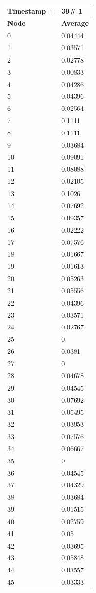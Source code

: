 \begin{tabular}{|l||l|}
\hline
\textbf{Timestamp =} & \textbf{39}\# 1\\\hline
	\textbf{Node} & \textbf{Average} \\ \hline
\hline
	0 & 0.04444 \\ \hline
	1 & 0.03571 \\ \hline
	2 & 0.02778 \\ \hline
	3 & 0.00833 \\ \hline
	4 & 0.04286 \\ \hline
	5 & 0.04396 \\ \hline
	6 & 0.02564 \\ \hline
	7 & 0.1111 \\ \hline
	8 & 0.1111 \\ \hline
	9 & 0.03684 \\ \hline
	10 & 0.09091 \\ \hline
	11 & 0.08088 \\ \hline
	12 & 0.02105 \\ \hline
	13 & 0.1026 \\ \hline
	14 & 0.07692 \\ \hline
	15 & 0.09357 \\ \hline
	16 & 0.02222 \\ \hline
	17 & 0.07576 \\ \hline
	18 & 0.01667 \\ \hline
	19 & 0.01613 \\ \hline
	20 & 0.05263 \\ \hline
	21 & 0.05556 \\ \hline
	22 & 0.04396 \\ \hline
	23 & 0.03571 \\ \hline
	24 & 0.02767 \\ \hline
	25 & 0 \\ \hline
	26 & 0.0381 \\ \hline
	27 & 0 \\ \hline
	28 & 0.04678 \\ \hline
	29 & 0.04545 \\ \hline
	30 & 0.07692 \\ \hline
	31 & 0.05495 \\ \hline
	32 & 0.03953 \\ \hline
	33 & 0.07576 \\ \hline
	34 & 0.06667 \\ \hline
	35 & 0 \\ \hline
	36 & 0.04545 \\ \hline
	37 & 0.04329 \\ \hline
	38 & 0.03684 \\ \hline
	39 & 0.01515 \\ \hline
	40 & 0.02759 \\ \hline
	41 & 0.05 \\ \hline
	42 & 0.03695 \\ \hline
	43 & 0.05848 \\ \hline
	44 & 0.03557 \\ \hline
	45 & 0.03333 \\ \hline
\end{tabular}
